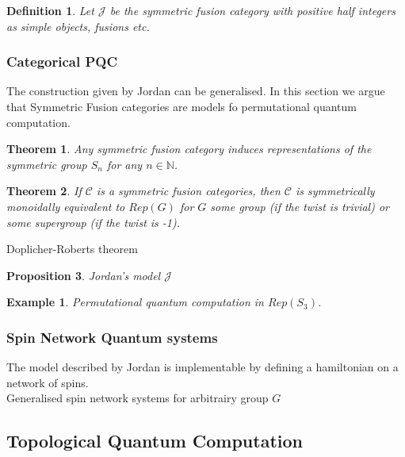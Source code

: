 \documentclass{article}
\newtheorem{definition}{Definition}
\newtheorem{example}{Example}
\newtheorem{theorem}{Theorem}
\newtheorem{proposition}[theorem]{Proposition}
\newenvironment{proof}[1][Proof]{\begin{trivlist}
\item[\hskip \labelsep {\bfseries #1}]}{\end{trivlist}}
\begin{document}
\begin{definition}
Let $\mathcal{J}$ be the symmetric fusion category with positive half integers as simple objects, fusions etc.
\end{definition}

\subsubsection{Categorical PQC}
The construction given by Jordan can be generalised. In this section we argue that Symmetric Fusion categories are models fo permutational quantum computation.

\begin{theorem}
Any symmetric fusion category induces representations of the symmetric group $S_n$ for any $n\in \mathbb{N}$.
\end{theorem}

\begin{theorem}
If $\mathcal{C}$ is a symmetric fusion categories, then $\mathcal{C}$ is symmetrically monoidally equivalent to $Rep(G)$ for $G$ some group (if the twist is trivial) or some supergroup (if the twist is -1).
\end{theorem}
\begin{proof}
Doplicher-Roberts theorem
\end{proof}

\begin{proposition}
Jordan's model $\mathcal{J}$
\end{proposition}
\begin{example}
Permutational quantum computation in $Rep(S_3)$.
\end{example}

\subsubsection{Spin Network Quantum systems}
The model described by Jordan is implementable by defining a hamiltonian on a network of spins.\\
Generalised spin network systems for arbitrairy group $G$



\subsection{Topological Quantum Computation}
\end{document}
